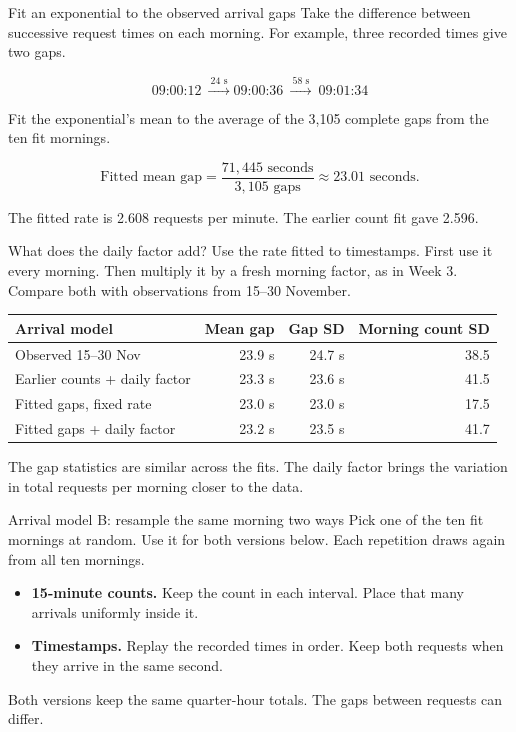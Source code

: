 \documentclass{beamer}
\begin{document}
\begin{frame}{Fit an exponential to the observed arrival gaps}
  Take the difference between successive request times on each morning.
  For example, three recorded times give two gaps.

  \[
    \text{09:00:12}\ \xrightarrow{\ 24\text{ s}\ }
    \text{09:00:36}\ \xrightarrow{\ 58\text{ s}\ }\ \text{09:01:34}
  \]

  Fit the exponential's mean to the average of the 3,105 complete gaps
  from the ten fit mornings.

  \[
    \text{Fitted mean gap} =
      \frac{71{,}445\text{ seconds}}{3{,}105\text{ gaps}}
      \approx 23.01\text{ seconds.}
  \]

  The fitted rate is 2.608 requests per minute. The earlier count fit
  gave 2.596.
\end{frame}

\begin{frame}{What does the daily factor add?}
  \small
  Use the rate fitted to timestamps. First use it every morning.
  Then multiply it by a fresh morning factor, as in Week 3.
  Compare both with observations from 15--30 November.

  \vspace{0.6em}
  \centering
  \setlength{\tabcolsep}{4pt}
  \begin{tabular}{@{}lrrr@{}}
    \toprule
    Arrival model & Mean gap & Gap SD & Morning count SD\\
    \midrule
    Observed 15--30 Nov & 23.9 s & 24.7 s & 38.5\\
    Earlier counts + daily factor & 23.3 s & 23.6 s & 41.5\\
    Fitted gaps, fixed rate & 23.0 s & 23.0 s & 17.5\\
    Fitted gaps + daily factor & 23.2 s & 23.5 s & 41.7\\
    \bottomrule
  \end{tabular}

  \vspace{0.55em}
  \raggedright
  The gap statistics are similar across the fits. The daily factor
  brings the variation in total requests per morning closer to the data.
\end{frame}

\begin{frame}{Arrival model B: resample the same morning two ways}
  Pick one of the ten fit mornings at random. Use it for both versions
  below. Each repetition draws again from all ten mornings.

  \begin{itemize}
    \item \textbf{15-minute counts.} Keep the count in each interval.
      Place that many arrivals uniformly inside it.
    \item \textbf{Timestamps.} Replay the recorded times in order.
      Keep both requests when they arrive in the same second.
  \end{itemize}

  Both versions keep the same quarter-hour totals. The gaps between
  requests can differ.
\end{frame}
\end{document}

